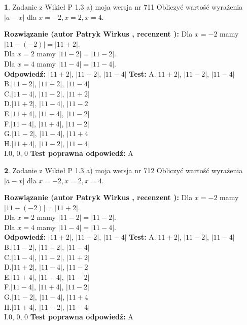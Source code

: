 \documentclass[12pt, a4paper]{article}
\theoremstyle{definition} %
\newtheorem{zad}{}
\newcommand{\zadStart}[1]{\begin{zad}#1\newline}
\newcommand{\zadStop}{\end{zad}}
\newcommand{\rozwStart}[2]{\noindent \textbf{Rozwiązanie (autor #1 , recenzent #2): }\newline}
\newcommand{\rozwStop}{\newline}
\newcommand{\odpStart}{\noindent \textbf{Odpowiedź:}\newline}
\newcommand{\odpStop}{\newline}
\newcommand{\testStart}{\noindent \textbf{Test:}\newline}
\newcommand{\testStop}{\newline}
\newcommand{\kluczStart}{\noindent \textbf{Test poprawna odpowiedź:}\newline}
\newcommand{\kluczStop}{\newline}
\begin{document}
\zadStart{Zadanie z Wikieł P 1.3 a) moja wersja nr 711}
Obliczyć wartość wyrażenia $|a - x|$ dla $x=-2,x=2,x=4$.
\zadStop
\rozwStart{Patryk Wirkus}{}
Dla $x = -2$ mamy $|11 - (-2)| = |11 + 2|$.\\
Dla $x = 2$ mamy $|11 - 2| = |11 - 2|$.\\
Dla $x = 4$ mamy $|11 - 4| = |11 - 4|$.\\
\rozwStop
\odpStart
$|11 + 2|$, $|11 - 2|$, $|11 - 4|$
\odpStop
\testStart
A.$|11 + 2|$, $|11 - 2|$, $|11 - 4|$\\
B.$|11 - 2|$, $|11 + 2|$, $|11 - 4|$\\
C.$|11 - 4|$, $|11 - 2|$, $|11 + 2|$\\
D.$|11 + 2|$, $|11 - 4|$, $|11 - 2|$\\
E.$|11 + 4|$, $|11 - 4|$, $|11 - 2|$\\
F.$|11 - 4|$, $|11 + 4|$, $|11 - 2|$\\
G.$|11 - 2|$, $|11 - 4|$, $|11 + 4|$\\
H.$|11 + 4|$, $|11 - 2|$, $|11 - 4|$\\
I.$0$, $0$, $0$
\testStop
\kluczStart
A
\kluczStop



\zadStart{Zadanie z Wikieł P 1.3 a) moja wersja nr 712}
Obliczyć wartość wyrażenia $|a - x|$ dla $x=-2,x=2,x=4$.
\zadStop
\rozwStart{Patryk Wirkus}{}
Dla $x = -2$ mamy $|11 - (-2)| = |11 + 2|$.\\
Dla $x = 2$ mamy $|11 - 2| = |11 - 2|$.\\
Dla $x = 4$ mamy $|11 - 4| = |11 - 4|$.\\
\rozwStop
\odpStart
$|11 + 2|$, $|11 - 2|$, $|11 - 4|$
\odpStop
\testStart
A.$|11 + 2|$, $|11 - 2|$, $|11 - 4|$\\
B.$|11 - 2|$, $|11 + 2|$, $|11 - 4|$\\
C.$|11 - 4|$, $|11 - 2|$, $|11 + 2|$\\
D.$|11 + 2|$, $|11 - 4|$, $|11 - 2|$\\
E.$|11 + 4|$, $|11 - 4|$, $|11 - 2|$\\
F.$|11 - 4|$, $|11 + 4|$, $|11 - 2|$\\
G.$|11 - 2|$, $|11 - 4|$, $|11 + 4|$\\
H.$|11 + 4|$, $|11 - 2|$, $|11 - 4|$\\
I.$0$, $0$, $0$
\testStop
\kluczStart
A
\kluczStop
\end{document}
